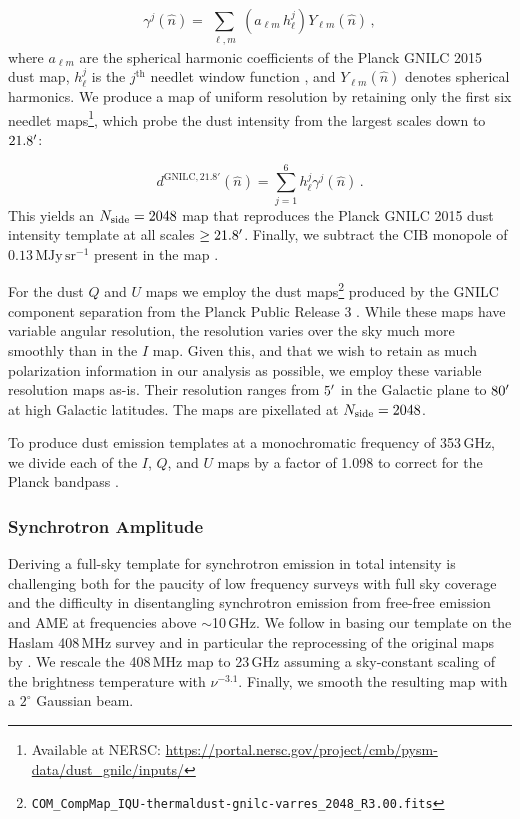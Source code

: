 \documentclass[twocolumn]{aastex631}
\begin{document}
\begin{equation}
\gamma^{j}(\hat{n})
=\sum_{\substack{\ell,m}} \left(a_{\ell m}\, h^{j}_\ell\right)Y_{\ell m}(\hat{n})\,,
\label{eq:needlets_maps}
\end{equation}
where $a_{\ell m}$ are the spherical harmonic coefficients of the Planck GNILC 2015 dust map,  $h^{j}_\ell$ is the $j^\text{th}$ needlet window function \citep[see][Figure~A.2]{planck2016-XLVIII}, and $Y_{\ell m}(\hat{n})$ denotes spherical harmonics. We produce a map of uniform resolution by retaining only the first six needlet maps\footnote{Available at NERSC: \url{https://portal.nersc.gov/project/cmb/pysm-data/dust_gnilc/inputs/}}, which probe the dust intensity from the largest scales down to $21.8\mbox{$^\prime$}$:

 \begin{equation}
 d^{\text{GNILC,}\, 21.8'}(\hat{n})
=\sum_{j=1}^6 h^{j}_\ell \gamma^{j}(\hat{n})\,.
\label{eq:trucated_synthesis}
\end{equation}
This yields an $N_{\rm side} = 2048$ map that reproduces the Planck GNILC 2015 dust intensity template at all scales $\geq 21.8\mbox{$^\prime$}$. Finally, we subtract the CIB monopole of $0.13\, \text{MJy}\,\text{sr}^{-1}$ present in the map \citep[][Section~2.2]{planck2016-l11B}.

For the dust $Q$ and $U$ maps we employ the dust maps\footnote{\texttt{COM\_CompMap\_IQU-thermaldust-gnilc-varres\_2048\_R3.00.fits}} produced by the GNILC component separation from the Planck Public Release 3 \citep{planck2016-l04,planck2016-l11B}. While these maps have variable angular resolution, the resolution varies over the sky much more smoothly than in the $I$ map. Given this, and that we wish to retain as much polarization information in our analysis as possible, we employ these variable resolution maps as-is. Their resolution ranges from $5\mbox{$^\prime$}$ in the Galactic plane to $80\mbox{$^\prime$}$ at high Galactic latitudes. The maps are pixellated at $N_{\rm side} = 2048$. 

To produce dust emission templates at a monochromatic frequency of 353\,GHz, we divide each of the $I$, $Q$, and $U$ maps by a factor of 1.098 to correct for the Planck bandpass \citep[][Table~2]{planck2016-l11A}.

\subsubsection{Synchrotron Amplitude}
Deriving a full-sky template for synchrotron emission in total intensity is challenging both for the paucity of low frequency surveys with full sky coverage and the difficulty in disentangling synchrotron emission from free-free emission and AME at frequencies above $\sim$10\,GHz. We follow \citet{Thorne:2017} in basing our template on the Haslam 408\,MHz survey \citep{Haslam:1982} and in particular the reprocessing of the original maps by \citet{Remazeilles:2015}. We rescale the 408\,MHz map to 23\,GHz assuming a sky-constant scaling of the brightness temperature with $\nu^{-3.1}$. Finally, we smooth the resulting map with a $2^\circ$ Gaussian beam.
\end{document}

